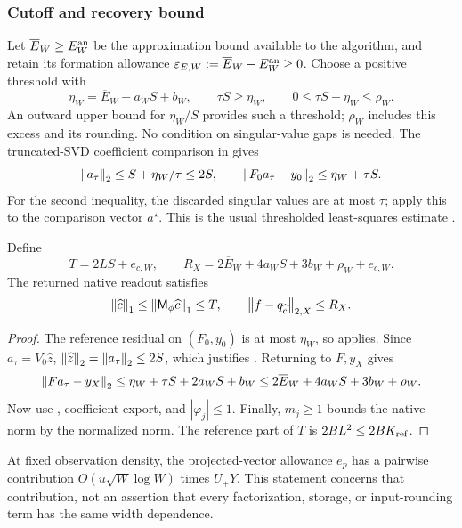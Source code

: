 \subsubsection{Cutoff and recovery bound}
Let $\overline E_W\ge E_W^{\rm an}$ be the approximation bound available to
the algorithm, and retain its formation allowance
$\varepsilon_{E,W}:=\overline E_W-E_W^{\rm an}\ge0$.
Choose a positive threshold with
\begin{equation}
 \eta_W=\overline E_W+a_WS+b_W,\qquad
 \tau S\ge\eta_W,\qquad 0\le\tau S-\eta_W\le\rho_W.
 \label{eq:eta}
\end{equation}
An outward upper bound for $\eta_W/S$ provides such a threshold; $\rho_W$
includes this excess and its rounding. No condition on singular-value gaps
is needed. The truncated-SVD coefficient comparison in
\cite[Theorem~3.8, first inequality]{AdcockHuybrechs2020} gives
\begin{equation}
 \left\lVert a_\tau\right\rVert_2\le S+\eta_W/\tau\le2S,
 \qquad \left\lVert F_0a_\tau-y_0\right\rVert_2\le\eta_W+\tau S.
 \label{eq:tsvd-standard}
\end{equation}
For the second inequality, the discarded singular values are at most $\tau$;
apply this to the comparison vector $a^\star$. This is the usual
thresholded least-squares estimate \cite{Hansen1987TSVD}.

\begin{proposition}
\label{prop:svd-recovery}
Define
\begin{equation}
 T=2LS+e_{c,W},\qquad
 R_X=2\overline E_W+4a_WS+3b_W+\rho_W+e_{c,W}.
 \label{eq:T-RX}
\end{equation}
The returned native readout satisfies
\begin{equation}
 \left\lVert \widehat c\right\rVert_1\le\left\lVert \mathsf M_\phi\widehat c\right\rVert_1\le T,
 \qquad \left\lVert f-q_{\widehat c}\right\rVert_{2,X}\le R_X.
 \label{eq:sampled-recovery}
\end{equation}
\end{proposition}
\begin{proof}
The reference residual on $(F_0,y_0)$ is at most $\eta_W$, so
 applies. Since $a_\tau=V_0\widehat z$,
$\left\lVert \widehat z\right\rVert_2=\left\lVert a_\tau\right\rVert_2\le2S$, which justifies
. Returning to $F,y_X$ gives
\[
 \left\lVert Fa_\tau-y_X\right\rVert_2
 \le\eta_W+\tau S+2a_WS+b_W
 \le2\overline E_W+4a_WS+3b_W+\rho_W.
\]
Now use , coefficient export, and
$|\varphi_j|\le1$. Finally, $m_j\ge1$ bounds the native norm by the normalized
norm. The reference part of $T$ is $2BL^2\le2BK_{\rm ref}$.
\end{proof}
At fixed observation density, the projected-vector allowance $e_p$ has a
pairwise contribution $O(u\sqrt W\log W)$ times $U_+Y$. This statement
concerns that contribution, not an assertion that every factorization,
storage, or input-rounding term has the same width dependence.


